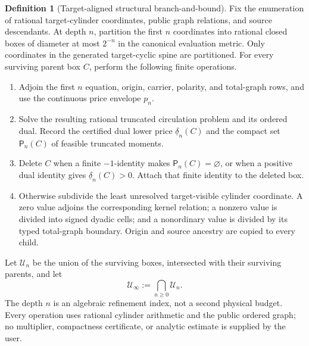 \documentclass[11pt]{article}
\numberwithin{section}{part}
\theoremstyle{plain}
\theoremstyle{definition}
\newtheorem{definition}[definition]{Definition}
\theoremstyle{remark}
\begin{document}
\begin{definition}[Target-aligned structural branch-and-bound]
\label{def:target-aligned-structural-branch-bound}
Fix the enumeration of rational target-cylinder coordinates, public graph
relations, and source descendants.  At depth \(n\), partition the first
\(n\) coordinates into rational closed boxes of diameter at most \(2^{-n}\)
in the canonical evaluation metric.  Only coordinates in the generated
target-cyclic spine are partitioned.  For every surviving parent box \(C\),
perform the following finite operations.
\begin{enumerate}[label=\textup{(B\arabic*)}]
\item Adjoin the first \(n\) equation, origin, carrier, polarity, and
total-graph rows, and use the continuous price envelope \(p_n\).
\item Solve the resulting rational truncated circulation problem and its
ordered dual.  Record the certified dual lower price
\(\underline\delta_n(C)\) and the compact set
\(\mathsf P_n(C)\) of feasible truncated moments.
\item Delete \(C\) when a finite \(-1\)-identity makes
\(\mathsf P_n(C)=\varnothing\), or when a positive dual identity gives
\(\underline\delta_n(C)>0\).  Attach that finite identity to the deleted
box.
\item Otherwise subdivide the least unresolved target-visible cylinder
coordinate.  A zero value adjoins the corresponding kernel relation; a
nonzero value is divided into signed dyadic cells; and a nonordinary value
is divided by its typed total-graph boundary.  Origin and source ancestry are
copied to every child.
\end{enumerate}
Let \(\mathscr U_n\) be the union of the surviving boxes, intersected with
their surviving parents, and let
\begin{equation}
 \label{eq:target-structural-computable-core}
 \mathscr U_\infty:=\bigcap_{n\ge0}\mathscr U_n.
\end{equation}
The depth \(n\) is an algebraic refinement index, not a second physical
budget.  Every operation uses rational cylinder arithmetic and the public
ordered graph; no multiplier, compactness certificate, or analytic estimate
is supplied by the user.
\end{definition}
\end{document}
